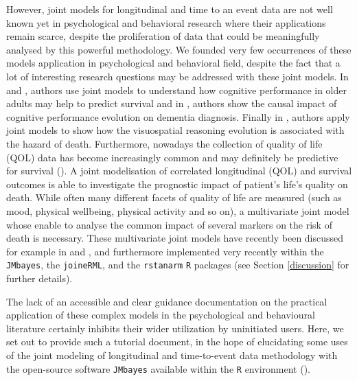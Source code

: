 \documentclass[12pt]{article}
\begin{document}
However, joint models for longitudinal and time to an event data are not well known yet in psychological and behavioral research where their applications remain scarce, despite the proliferation of data that could be meaningfully analysed by this powerful methodology. We founded very few occurrences of these models application in psychological and behavioral field, despite the fact that a lot of interesting research questions may be addressed with these joint models. In \cite{Ghisletta_2006} and \cite{ghisletta2008application}, authors use joint models to understand how cognitive performance in older adults may help to predict survival and in \cite{McArdle_2005}, authors show the causal impact of cognitive performance evolution on dementia diagnosis. Finally in \cite{Muniz_2018}, authors apply joint models to show how the visuospatial reasoning evolution is associated with the hazard of death. Furthermore, nowadays the collection of quality of life (QOL) data has become increasingly common and may definitely be predictive for survival (\cite{gould_joint_2015}). A joint modelisation of correlated longitudinal (QOL) and survival outcomes is able to investigate the prognostic impact of patient's life's quality on death. While often many different facets of quality of life are measured (such as mood, physical wellbeing, physical activity and so on), a multivariate joint model whose enable to analyse the common impact of several markers on the risk of death is necessary. These multivariate joint models have recently been discussed for example in \cite{hickey2016joint} and \cite{he2016joint}, and furthermore implemented very recently within the \texttt{JMbayes}, the \texttt{joineRML}, and the \texttt{rstanarm} \texttt{R} packages (see Section \ref{discussion} for further details).

The lack of an accessible and clear guidance documentation on the practical application of these complex models in the psychological and behavioural literature certainly inhibits their wider utilization by uninitiated users. Here, we set out to provide such a tutorial document, in the hope of elucidating some uses of the joint modeling of longitudinal and time-to-event data methodology with the open-source software \texttt{JMbayes} available within the \texttt{R} environment (\cite{JMbayes}).
\end{document}

